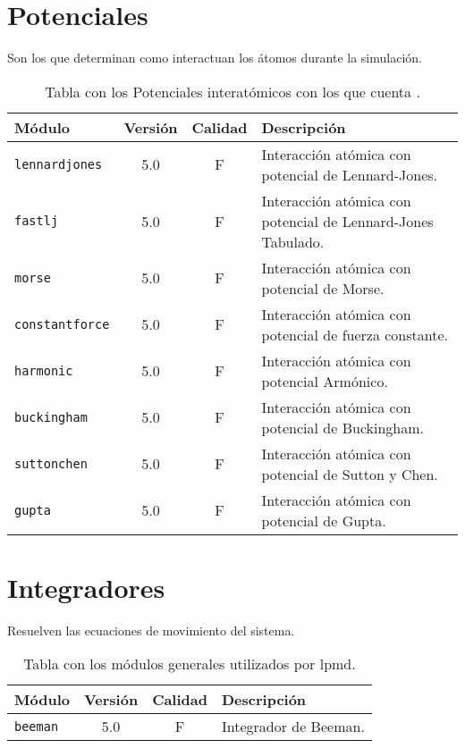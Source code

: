 \section{Potenciales}
Son los que determinan como interactuan los \'atomos durante la simulaci\'on.

\begin{table}[h!]
 \begin{tabular}{|l|c|c|p{10cm}|}\hline
 M\'odulo & Versi\'on & Calidad & Descripci\'on \\
 \hline\hline
 \texttt{lennardjones} & 5.0 & F & Interacci\'on at\'omica con potencial de Lennard-Jones.\\
 \hline
 \texttt{fastlj} & 5.0 & F & Interacci\'on at\'omica con potencial de Lennard-Jones Tabulado.\\
 \hline
 \texttt{morse} & 5.0 & F & Interacci\'on at\'omica con potencial de Morse.\\
 \hline
 \texttt{constantforce} & 5.0 & F & Interacci\'on at\'omica con potencial de fuerza constante.\\
 \hline
 \texttt{harmonic} & 5.0 & F & Interacci\'on at\'omica con potencial Arm\'onico.\\
 \hline
 \texttt{buckingham} & 5.0 & F & Interacci\'on at\'omica con potencial de Buckingham.\\
 \hline
 \texttt{suttonchen} & 5.0 & F & Interacci\'on at\'omica con potencial de Sutton y Chen.\\
 \hline
 \texttt{gupta} & 5.0 & F & Interacci\'on at\'omica con potencial de Gupta.\\
 \hline
 \end{tabular}
\label{tab:modpotentials}
\caption{Tabla con los Potenciales interat\'omicos con los que cuenta {\lpmd}.}
\end{table}

\section{Integradores}
Resuelven las ecuaciones de movimiento del sistema.

\begin{table}[h!]
 \begin{tabular}{|l|c|c|p{10cm}|}\hline
 M\'odulo & Versi\'on & Calidad & Descripci\'on \\
 \hline\hline
 \texttt{beeman} & 5.0 & F & Integrador de Beeman.\\
 \hline
 \end{tabular}
\label{tab:modginteg}
\caption{Tabla con los m\'odulos generales utilizados por lpmd.}
\end{table}


